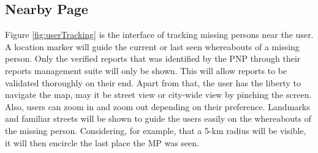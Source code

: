 \subsection{Nearby Page}

Figure \ref{fig:userTracking} is the interface of tracking missing persons near the user. A location marker will guide the current or last seen whereabouts of a missing person. Only the verified reports that was identified by the PNP through their reports management suite will only be shown. This will allow reports to be validated thoroughly on their end. Apart from that, the user has the liberty to navigate the map, may it be street view or city-wide view by pinching the screen. Also, users can zoom in and zoom out depending on their preference. Landmarks and familiar streets will be shown to guide the users easily on the whereabouts of the missing person. Considering, for example, that a 5-km radius will be visible, it will then encircle the last place the MP was seen.

